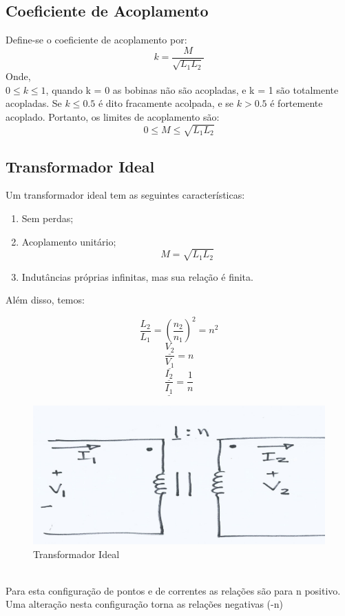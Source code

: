 \documentclass[a4paper, 12pt]{article}
\begin{document}
	\subsection{Coeficiente de Acoplamento}
		Define-se o coeficiente de acoplamento por:
		\begin{equation}
			k = \frac{M}{\sqrt{L_1L_2}}
		\end{equation}
		Onde, \\
		$0 \leq k \leq 1$, quando k = 0 as bobinas não são acopladas, e k = 1 são totalmente acopladas.
		Se $k \leq 0.5$ é dito fracamente acolpada, e se $k > 0.5$ é fortemente acoplado. Portanto, os limites de acoplamento são:
		\begin{equation}
			0 \leq M \leq \sqrt{L_1L_2}
		\end{equation}

	\subsection{Transformador Ideal}
		Um transformador ideal tem as seguintes características:
		\begin{enumerate}
			\item Sem perdas;
			\item Acoplamento unitário;
				\begin{equation}
					M = \sqrt{L_1L_2}
				\end{equation}
			\item Indutâncias próprias infinitas, mas sua relação é finita.
		\end{enumerate}
		Além disso, temos:
			
			\begin{equation}
				\frac{L_2}{L_1} = (\frac{n_2}{n_1})^2 = n^2
			\end{equation}
			\begin{equation}
				\frac{\underline{V_2}}{\underline{V_1}} = n
			\end{equation}
			\begin{equation}
				\frac{\underline{I_2}}{\underline{I_1}} = \frac{1}{n}
			\end{equation}
			\begin{figure}[h]
				\centering
				\includegraphics[scale=0.4]{a18.png}
				\caption{Transformador Ideal}
			\end{figure}\\
Para esta configuração de pontos e de correntes as relações são para n positivo. Uma alteração nesta configuração torna as relações negativas (-n)
\end{document}
